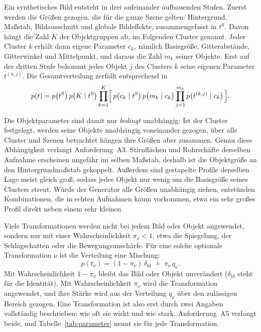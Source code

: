 Ein synthetisches Bild entsteht in drei aufeinander aufbauenden Stufen. Zuerst
werden die Größen gezogen, die für die ganze Szene gelten: Hintergrund,
Maßstab, Bildausschnitt und globale Bildeffekte, zusammengefasst in
$t^{\mathrm{S}}$. Davon hängt die Zahl $K$ der Objektgruppen ab, im Folgenden
Cluster genannt. Jeder Cluster $k$ erhält dann eigene Parameter $c_k$, nämlich
Basisgröße, Gitterabstände, Gitterwinkel und Mittelpunkt, und daraus die Zahl
$m_k$ seiner Objekte. Erst auf der dritten Stufe bekommt jedes Objekt $j$ des
Clusters $k$ seine eigenen Parameter $t^{(k,j)}$. Die Gesamtverteilung zerfällt
entsprechend in
\begin{equation}
  p(t)
  =
  p\bigl(t^{\mathrm{S}}\bigr)\,
  p\bigl(K \mid t^{\mathrm{S}}\bigr)
  \prod_{k=1}^{K}
  \Bigl[\,
    p\bigl(c_k \mid t^{\mathrm{S}}\bigr)\,
    p\bigl(m_k \mid c_k\bigr)
    \prod_{j=1}^{m_k} p\bigl(t^{(k,j)} \mid c_k\bigr)
  \,\Bigr].
  \label{eq:faktorisierung}
\end{equation}

Die Objektparameter sind damit nur \emph{bedingt} unabhängig: Ist der Cluster
festgelegt, werden seine Objekte unabhängig voneinander gezogen, über alle
Cluster und Szenen betrachtet hängen ihre Größen aber zusammen. Genau diese
Abhängigkeit verlangt Anforderung~A3. Stirnflächen und Rohrschäfte derselben
Aufnahme erscheinen ungefähr im selben Maßstab, deshalb ist die Objektgröße an
den Hintergrundmaßstab gekoppelt. Außerdem sind gestapelte Profile derselben
Lage meist gleich groß, sodass jedes Objekt nur wenig um die Basisgröße seines
Clusters streut. Würde der Generator alle Größen unabhängig ziehen, entstünden
Kombinationen, die in echten Aufnahmen kaum vorkommen, etwa ein sehr großes
Profil direkt neben einem sehr kleinen.

Viele Transformationen werden nicht bei jedem Bild oder Objekt angewendet,
sondern nur mit einer Wahrscheinlichkeit $\pi_\nu < 1$, etwa die Spiegelung,
der Schlagschatten oder die Bewegungsunschärfe. Für eine solche optionale
Transformation $\nu$ ist die Verteilung eine Mischung:
\begin{equation}
  p(t_\nu)
  =
  (1-\pi_\nu)\,\delta_{\mathrm{id}}
  \;+\;
  \pi_\nu\, q_\nu .
  \label{eq:mischung}
\end{equation}
Mit Wahrscheinlichkeit $1-\pi_\nu$ bleibt das Bild oder Objekt unverändert
($\delta_{\mathrm{id}}$ steht für die Identität). Mit Wahrscheinlichkeit
$\pi_\nu$ wird die Transformation angewendet, und ihre Stärke wird aus der
Verteilung $q_\nu$ über den zulässigen Bereich gezogen. Eine Transformation ist
also erst durch zwei Angaben vollständig beschrieben: wie oft sie wirkt und wie
stark. Anforderung~A5 verlangt beide, und Tabelle~\ref{tab:parameter} nennt sie
für jede Transformation.

